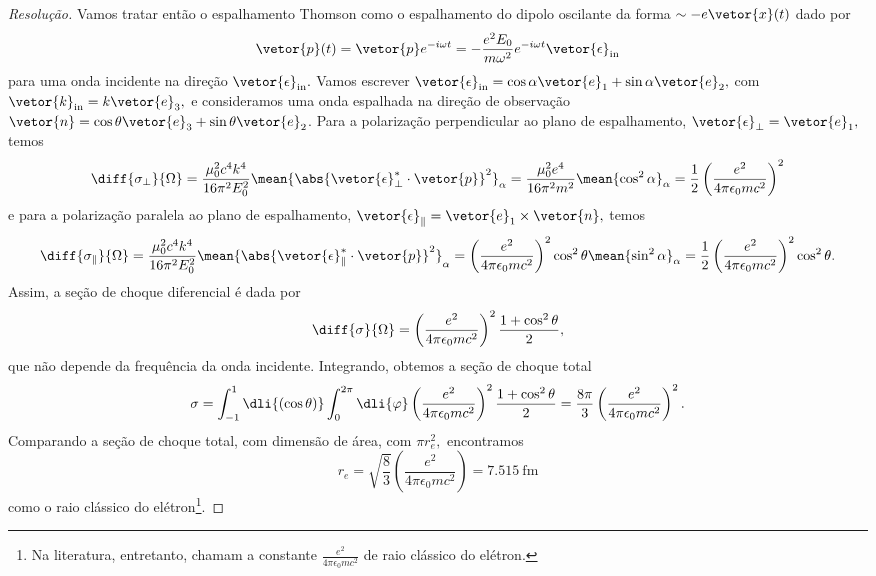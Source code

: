 \begin{proof}[Resolução]
   Vamos tratar então o espalhamento Thomson como o espalhamento do dipolo oscilante da forma \(\sim -e \vetor{x}(t)\) dado por
   \begin{equation*}
      \vetor{p}(t) = \vetor{p} e^{-i \omega t} =  -\frac{e^2 E_0}{m \omega^2} e^{-i \omega t}\vetor{\epsilon}_\mathrm{in}
   \end{equation*}
   para uma onda incidente na direção \(\vetor{\epsilon}_\mathrm{in}.\) Vamos escrever \(\vetor{\epsilon}_{\mathrm{in}} = \cos \alpha \vetor{e}_1 + \sin \alpha \vetor{e}_2,\) com \(\vetor{k}_{\mathrm{in}} = k \vetor{e}_3,\) e consideramos uma onda espalhada na direção de observação \(\vetor{n} = \cos\theta \vetor{e}_3 + \sin\theta \vetor{e}_2\). Para a polarização perpendicular ao plano de espalhamento, \(\vetor{\epsilon}_{\perp} = \vetor{e}_1,\) temos
   \begin{equation*}
      \diff{\sigma_{\perp}}{\Omega} = \frac{\mu_0^2 c^4 k^4}{16 \pi^2 E_0^2}\mean{\abs{\vetor{\epsilon}_{\perp}^* \cdot \vetor{p}}^2}_{\alpha} = \frac{\mu_0^2 e^4}{16 \pi^2 m^2} \mean{\cos^2 \alpha}_\alpha = \frac12\left(\frac{e^2}{4\pi \epsilon_0 m c^2}\right)^2
   \end{equation*}
   e para a polarização paralela ao plano de espalhamento, \(\vetor{\epsilon}_\parallel = \vetor{e}_1 \times \vetor{n},\) temos
   \begin{equation*}
      \diff{\sigma_{\parallel}}{\Omega} = \frac{\mu_0^2 c^4 k^4}{16 \pi^2 E_0^2}\mean{\abs{\vetor{\epsilon}_{\parallel}^* \cdot \vetor{p}}^2}_{\alpha} = \left(\frac{e^2}{4\pi \epsilon_0 m c^2}\right)^2 \cos^2\theta \mean{\sin^2 \alpha}_\alpha = \frac12\left(\frac{e^2}{4\pi \epsilon_0 m c^2}\right)^2 \cos^2\theta.
   \end{equation*}
   Assim, a seção de choque diferencial é dada por
   \begin{equation*}
      \diff{\sigma}{\Omega} = \left(\frac{e^2}{4\pi \epsilon_0 m c^2}\right)^2 \frac{1 + \cos^2\theta}{2},
   \end{equation*}
   que não depende da frequência da onda incidente. Integrando, obtemos a seção de choque total
   \begin{equation*}
      \sigma = \int_{-1}^1 \dli{(\cos\theta)} \int_0^{2\pi} \dli{\varphi} \left(\frac{e^2}{4\pi \epsilon_0 m c^2}\right)^2 \frac{1 + \cos^2\theta}{2} = \frac{8\pi}{3} \left(\frac{e^2}{4\pi \epsilon_0 m c^2}\right)^2.
   \end{equation*}
   Comparando a seção de choque total, com dimensão de área, com \(\pi r_e^2,\) encontramos
   \begin{equation*}
      r_e = \sqrt{\frac{8}{3}} \left(\frac{e^2}{4\pi \epsilon_0 mc^2}\right) = \SI{7.515}{\femto\meter}
   \end{equation*}
   como o raio clássico do elétron\footnote{Na literatura, entretanto, chamam a constante \(\frac{e^2}{4\pi \epsilon_0 mc^2}\) de raio clássico do elétron.}.
\end{proof}
